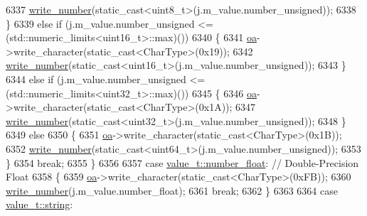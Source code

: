 \begin{DoxyCode}
6337                     \hyperlink{classnlohmann_1_1detail_1_1binary__writer_a62cfd50a511371e718f37ad7bb29ae9d}{write\_number}(static\_cast<uint8\_t>(j.m\_value.number\_unsigned));
6338                 \}
6339                 \textcolor{keywordflow}{else} \textcolor{keywordflow}{if} (j.m\_value.number\_unsigned <= (std::numeric\_limits<uint16\_t>::max)())
6340                 \{
6341                     \hyperlink{classnlohmann_1_1detail_1_1binary__writer_a6f15b782a7900f50ef37d123008e601b}{oa}->write\_character(static\_cast<CharType>(0x19));
6342                     \hyperlink{classnlohmann_1_1detail_1_1binary__writer_a62cfd50a511371e718f37ad7bb29ae9d}{write\_number}(static\_cast<uint16\_t>(j.m\_value.number\_unsigned));
6343                 \}
6344                 \textcolor{keywordflow}{else} \textcolor{keywordflow}{if} (j.m\_value.number\_unsigned <= (std::numeric\_limits<uint32\_t>::max)())
6345                 \{
6346                     \hyperlink{classnlohmann_1_1detail_1_1binary__writer_a6f15b782a7900f50ef37d123008e601b}{oa}->write\_character(static\_cast<CharType>(0x1A));
6347                     \hyperlink{classnlohmann_1_1detail_1_1binary__writer_a62cfd50a511371e718f37ad7bb29ae9d}{write\_number}(static\_cast<uint32\_t>(j.m\_value.number\_unsigned));
6348                 \}
6349                 \textcolor{keywordflow}{else}
6350                 \{
6351                     \hyperlink{classnlohmann_1_1detail_1_1binary__writer_a6f15b782a7900f50ef37d123008e601b}{oa}->write\_character(static\_cast<CharType>(0x1B));
6352                     \hyperlink{classnlohmann_1_1detail_1_1binary__writer_a62cfd50a511371e718f37ad7bb29ae9d}{write\_number}(static\_cast<uint64\_t>(j.m\_value.number\_unsigned));
6353                 \}
6354                 \textcolor{keywordflow}{break};
6355             \}
6356 
6357             \textcolor{keywordflow}{case} \hyperlink{namespacenlohmann_1_1detail_a1ed8fc6239da25abcaf681d30ace4985ad9966ecb59667235a57b4b999a649eef}{value\_t::number\_float}: \textcolor{comment}{// Double-Precision Float}
6358             \{
6359                 \hyperlink{classnlohmann_1_1detail_1_1binary__writer_a6f15b782a7900f50ef37d123008e601b}{oa}->write\_character(static\_cast<CharType>(0xFB));
6360                 \hyperlink{classnlohmann_1_1detail_1_1binary__writer_a62cfd50a511371e718f37ad7bb29ae9d}{write\_number}(j.m\_value.number\_float);
6361                 \textcolor{keywordflow}{break};
6362             \}
6363 
6364             \textcolor{keywordflow}{case} \hyperlink{namespacenlohmann_1_1detail_a1ed8fc6239da25abcaf681d30ace4985ab45cffe084dd3d20d928bee85e7b0f21}{value\_t::string}:

\end{DoxyCode}
